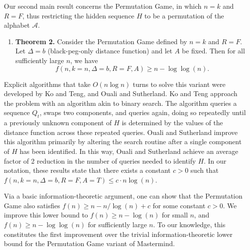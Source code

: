 \documentclass[12pt, a4paper]{article}
\begin{document}
Our second main result concerns the Permutation Game, in which $n=k$ and $R=F$, thus restricting the hidden sequence $H$ to be a permutation of the alphabet $\mathcal{A}$.
\begin{enumerate}[label=]
	\item\textbf{Theorem 2.} Consider the Permutation Game defined by $n = k$ and $R = F$. Let $\Delta = b$ (black-peg-only distance function) and let $A$ be fixed. Then for all sufficiently large $n$, we have
	\begin{equation*}
		f(n, k = n, \Delta = b, R = F, A) \ge n - \log\log(n).
	\end{equation*}
\end{enumerate}
Explicit algorithms that take $O(n \log n)$ turns to solve this variant were developed by Ko and Teng\cite{KT86}, and Ouali and Sutherland\cite{OS13}. Ko and Teng approach the problem with an algorithm akin to binary search. The algorithm queries a sequence $Q_t$, swaps two components, and queries again, doing so repeatedly until a previously unknown component of $H$ is determined by the values of the distance function across these repeated queries. Ouali and Sutherland improve this algorithm primarily by altering the search routine after a single component of $H$ has been identified. In this way, Ouali and Sutherland achieve an average factor of 2 reduction in the number of queries needed to identify $H$. In our notation, these results state that there exists a constant $c>0$ such that $f(n, k=n, \Delta=b, R = F, A = T)\le c\cdot n\log(n)$.

Via a basic information-theoretic argument, one can show that the Permutation Game also satisfies $f(n)\ge n - n/\log(n) + c$ for some constant $c>0$. We improve this lower bound to $f(n)\ge n - \log(n)$ for small $n$, and $f(n)\ge n- \log \log(n)$ for sufficiently large $n$. To our knowledge, this constitutes the first improvement over the trivial information-theoretic lower bound for the Permutation Game variant of Mastermind.
\end{document}
